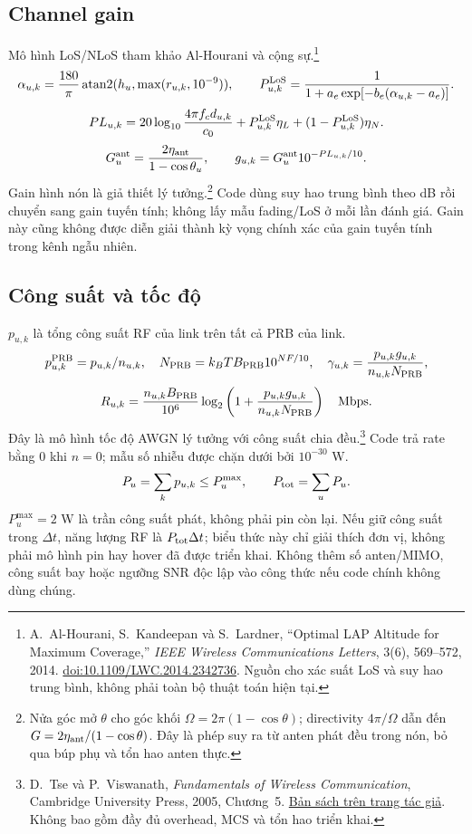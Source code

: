 \documentclass[11pt,a4paper]{article}
\begin{document}
\subsection{Channel gain}
Mô hình LoS/NLoS tham khảo Al-Hourani và cộng sự.\footnote{A.~Al-Hourani, S.~Kandeepan và S.~Lardner, ``Optimal LAP Altitude for Maximum Coverage,'' \emph{IEEE Wireless Communications Letters}, 3(6), 569--572, 2014. \href{https://doi.org/10.1109/LWC.2014.2342736}{doi:10.1109/LWC.2014.2342736}. Nguồn cho xác suất LoS và suy hao trung bình, không phải toàn bộ thuật toán hiện tại.}
\[
\alpha_{u,k}=\frac{180}{\pi}\operatorname{atan2}(h_u,\max(r_{u,k},10^{-9})),
\qquad P_{u,k}^{\rm LoS}=\frac1{1+a_e\exp[-b_e(\alpha_{u,k}-a_e)]}.
\]
\[
PL_{u,k}=20\log_{10}\frac{4\pi f_cd_{u,k}}{c_0}
+P_{u,k}^{\rm LoS}\eta_L+(1-P_{u,k}^{\rm LoS})\eta_N.
\]
\[
G_u^{\rm ant}=\frac{2\eta_{\rm ant}}{1-\cos\theta_u},\qquad
g_{u,k}=G_u^{\rm ant}10^{-PL_{u,k}/10}.
\]
Gain hình nón là giả thiết lý tưởng.\footnote{Nửa góc mở $\theta$ cho góc khối $\Omega=2\pi(1-\cos\theta)$; directivity $4\pi/\Omega$ dẫn đến $G=2\eta_{\rm ant}/(1-\cos\theta)$. Đây là phép suy ra từ anten phát đều trong nón, bỏ qua búp phụ và tổn hao anten thực.}
Code dùng suy hao trung bình theo dB rồi chuyển sang gain tuyến tính; không lấy mẫu fading/LoS ở mỗi lần đánh giá. Gain này cũng không được diễn giải thành kỳ vọng chính xác của gain tuyến tính trong kênh ngẫu nhiên.

\subsection{Công suất và tốc độ}
$p_{u,k}$ là tổng công suất RF của link trên tất cả PRB của link.
\[
p_{u,k}^{\rm PRB}=p_{u,k}/n_{u,k},\quad
N_{\rm PRB}=k_BT B_{\rm PRB}10^{NF/10},\quad
\gamma_{u,k}=\frac{p_{u,k}g_{u,k}}{n_{u,k}N_{\rm PRB}},
\]
\[
R_{u,k}=\frac{n_{u,k}B_{\rm PRB}}{10^6}
\log_2\left(1+\frac{p_{u,k}g_{u,k}}{n_{u,k}N_{\rm PRB}}\right)\quad\text{Mbps}.
\]
Đây là mô hình tốc độ AWGN lý tưởng với công suất chia đều.\footnote{D.~Tse và P.~Viswanath, \emph{Fundamentals of Wireless Communication}, Cambridge University Press, 2005, Chương~5. \href{https://stanford.edu/~dntse/wireless_book.html}{Bản sách trên trang tác giả}. Không bao gồm đầy đủ overhead, MCS và tổn hao triển khai.}
Code trả rate bằng $0$ khi $n=0$; mẫu số nhiễu được chặn dưới bởi $10^{-30}$ W.
\[
P_u=\sum_kp_{u,k}\le P_u^{\max},\qquad P_{\rm tot}=\sum_uP_u.
\]
$P_u^{\max}=2$ W là trần công suất phát, không phải pin còn lại.
Nếu giữ công suất trong $\Delta t$, năng lượng RF là $P_{\rm tot}\Delta t$; biểu thức này chỉ giải thích đơn vị, không phải mô hình pin hay hover đã được triển khai.
Không thêm số anten/MIMO, công suất bay hoặc ngưỡng SNR độc lập vào công thức nếu code chính không dùng chúng.
\end{document}

